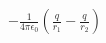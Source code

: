 \documentclass[preview]{standalone}
\begin{document}
\begin{align*}
-\frac{1}{4\pi\epsilon_0} \left( \frac{q}{r_1} - \frac{q}{r_2} \right)
\end{align*}
\end{document}
